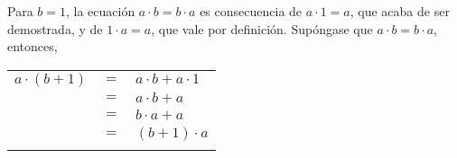 \begin{enumerate}[\bfseries 1.]
\begin{center}
\begin{tabular}{rcl}
	      \end{tabular}
	  \end{center}
	  Para $b=1$, la ecuación $a\cdot b=b\cdot a$ es consecuencia de $a\cdot 1=a$, que acaba de ser demostrada, y de $1\cdot a = a$, que vale por definición. Supóngase que $a\cdot b=b\cdot a$, entonces,
	  \begin{center}
	      \begin{tabular}{rcl}
		  $a\cdot (b+1)$&$=$&$a\cdot b + a\cdot 1$\\
		  &$=$&$a\cdot b + a$\\
		  &$=$&$b\cdot a + a$\\
		  &$=$&$(b+1)\cdot a$\\\\
	      \end{tabular}
	  \end{center}


\end{enumerate}
